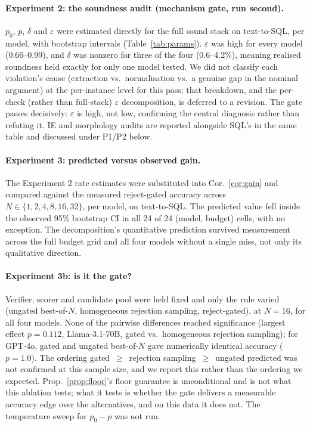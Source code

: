 \documentclass[11pt]{article}
\begin{document}
\paragraph{Experiment 2: the soundness audit (mechanism gate, run second).} $p_0$, $p$, $\delta$ and $\varepsilon$ were estimated directly for the full sound stack on text-to-SQL, per model, with bootstrap intervals (Table~\ref{tab:params}). $\varepsilon$ was high for every model (0.66--0.99), and $\delta$ was nonzero for three of the four (0.6--4.2\%), meaning realised soundness held exactly for only one model tested. We did not classify each violation's cause (extraction vs.\ normalisation vs.\ a genuine gap in the nominal argument) at the per-instance level for this pass; that breakdown, and the per-check (rather than full-stack) $\varepsilon$ decomposition, is deferred to a revision. The gate passes decisively: $\varepsilon$ is high, not low, confirming the central diagnosis rather than refuting it. IE and morphology audits are reported alongside SQL's in the same table and discussed under P1/P2 below.

\paragraph{Experiment 3: predicted versus observed gain.} The Experiment 2 rate estimates were substituted into Cor.~\ref{cor:gain} and compared against the measured reject-gated accuracy across $N\in\{1,2,4,8,16,32\}$, per model, on text-to-SQL. The predicted value fell inside the observed 95\% bootstrap CI in all 24 of 24 (model, budget) cells, with no exception. The decomposition's quantitative prediction survived measurement across the full budget grid and all four models without a single miss, not only its qualitative direction.

\paragraph{Experiment 3b: is it the gate?} Verifier, scorer and candidate pool were held fixed and only the rule varied (ungated best-of-$N$, homogeneous rejection sampling, reject-gated), at $N=16$, for all four models. None of the pairwise differences reached significance (largest effect $p=0.112$, Llama-3.1-70B, gated vs.\ homogeneous rejection sampling); for GPT-4o, gated and ungated best-of-$N$ gave numerically identical accuracy ($p=1.0$). The ordering gated~$\ge$~rejection sampling~$\ge$~ungated predicted was not confirmed at this sample size, and we report this rather than the ordering we expected. Prop.~\ref{prop:floor}'s floor guarantee is unconditional and is not what this ablation tests; what it tests is whether the gate delivers a measurable accuracy edge over the alternatives, and on this data it does not. The temperature sweep for $p_0-p$ was not run.
\end{document}
